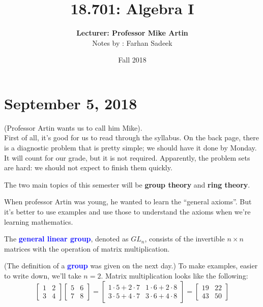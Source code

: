 \documentclass[11pt]{article}
\title{\textbf{18.701: Algebra I}}
\author{\textbf{Lecturer: Professor Mike Artin} \\ Notes by : Farhan Sadeek}
\date{Fall 2018}
\begin{document}
\maketitle
\section{September 5, 2018}
 (Professor Artin wants us to call him Mike). \\
First of all, it's good for us to read through the syllabus. On the back page, there is a diagnostic problem that is pretty simple; we should have it done by Monday. It will count for our grade, but it is not required. Apparently, the problem sets are hard: we should not expect to finish them quickly.
\begin{fact}
    The two main topics of this semester will be \textbf{group theory} and \textbf{ring theory}.
\end{fact}
When professor Artin was young, he wanted to learn the ``general axioms''. But it's better to use examples and use those to understand the axioms when we're learning mathematics.

\begin{definition}
    The \textcolor{blue}{\textbf{general linear group}}, denoted as $GL_n$, consists of the invertible $n \times n$ matrices with the operation of matrix multiplication.
\end{definition}

(The definition of a \textcolor{blue}{\textbf{group}} was given on the next day.) To make examples, easier to write down, we'll take $n = 2$. Matrix multiplication looks like the following:
\[
    \begin{bmatrix}
        1 & 2 \\
        3 & 4
    \end{bmatrix}
    \begin{bmatrix}
        5 & 6 \\
        7 & 8
    \end{bmatrix}
    =
    \begin{bmatrix}
        1 \cdot 5 + 2 \cdot 7 & 1 \cdot 6 + 2 \cdot 8 \\
        3 \cdot 5 + 4 \cdot 7 & 3 \cdot 6 + 4 \cdot 8
    \end{bmatrix}
    =
    \begin{bmatrix}
        19 & 22 \\
        43 & 50
    \end{bmatrix}
\]
\end{document}
